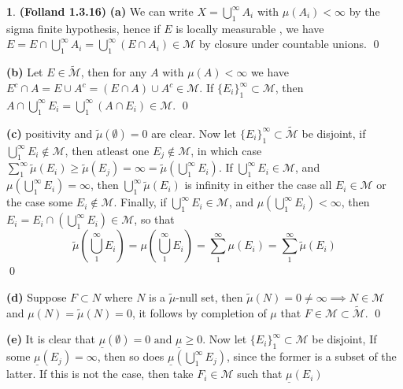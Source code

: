 \documentclass[10.5pt]{article}
\theoremstyle{definition}
\newtheorem{pb}{}
\newcommand{\set}[1]{\{#1\}}
\newcommand{\tand}{\text{ and }}
\begin{document}
    \begin{pb} \textbf{(Folland 1.3.16)}
        \textbf{(a)} We can write \(X = \bigcup_1^\infty A_i\) with \(\mu(A_i) < \infty\) by the sigma finite hypothesis, hence if \(E\) is locally measurable , we have \(E = E \cap \bigcup_1^\infty A_i = \bigcup_1^\infty (E \cap A_i) \in \mathcal{M}\) by closure under countable unions. \qed

        \textbf{(b)} Let \(E \in \tilde{\mathcal{M}}\), then for any \(A\) with \(\mu(A) < \infty\) we have \(E^c \cap A = E \cup A^c = (E \cap A) \cup A^c \in \mathcal{M}\). If \(\set{E_i}_1^\infty \subset \mathcal{M}\), then \(A \cap\bigcup_1^\infty E_i = \bigcup_1^\infty (A \cap E_i) \in \mathcal{M}\). \qed

        \textbf{(c)} positivity and \(\tilde{\mu}(\emptyset) = 0\) are clear. Now let \(\set{E_i}_1^\infty \subset \tilde{\mathcal{M}}\) be disjoint, if \(\bigcup_1^\infty E_i \not \in \mathcal{M}\), then atleast one \(E_j \not \in \mathcal{M}\), in which case \(\sum_1^\infty \tilde{\mu}(E_i) \geq \tilde{\mu}(E_j) = \infty = \tilde{\mu}(\bigcup_1^\infty E_i)\). If \(\bigcup_1^\infty E_i \in \mathcal{M}\), and \(\mu(\bigcup_1^\infty E_i) = \infty\), then \(\bigcup_1^\infty \tilde{\mu}(E_i)\) is infinity in either the case all \(E_i \in \mathcal{M}\) or the case some \(E_i \not \in \mathcal{M}\). Finally, if \(\bigcup_1^\infty E_i \in \mathcal{M}\), and \(\mu(\bigcup_1^\infty E_i) < \infty\), then \(E_i = E_i \cap\left(\bigcup_1^\infty E_i \right) \in \mathcal{M}\), so that \[\tilde{\mu}(\bigcup_1^\infty E_i) = \mu(\bigcup_1^\infty E_i) = \sum_1^\infty \mu(E_i) = \sum_1^\infty \tilde{\mu}(E_i)\] \qed

        \textbf{(d)} Suppose \(F \subset N\) where \(N\) is a \(\tilde{\mu}\)-null set, then \(\tilde{\mu}(N) = 0 \neq \infty \implies N \in \mathcal{M}\) and \(\mu(N) = \tilde{\mu}(N) = 0\), it follows by completion of \(\mu\) that \(F \in \mathcal{M} \subset \tilde{\mathcal{M}}\). \qed

        \textbf{(e)} It is clear that \(\underline{\mu}(\emptyset) = 0 \tand \underline{\mu} \geq 0\). Now let \(\set{E_i}_1^\infty \subset \mathcal{M}\) be disjoint, If some \(\underline{\mu}(E_j) = \infty\), then so does \(\underline{\mu}(\bigcup_1^\infty E_j)\), since the former is a subset of the latter. If this is not the case, then take \(F_i \in \mathcal{M}\) such that \(\underline{\mu}(E_i)\)
    \end{pb}
\end{document}
